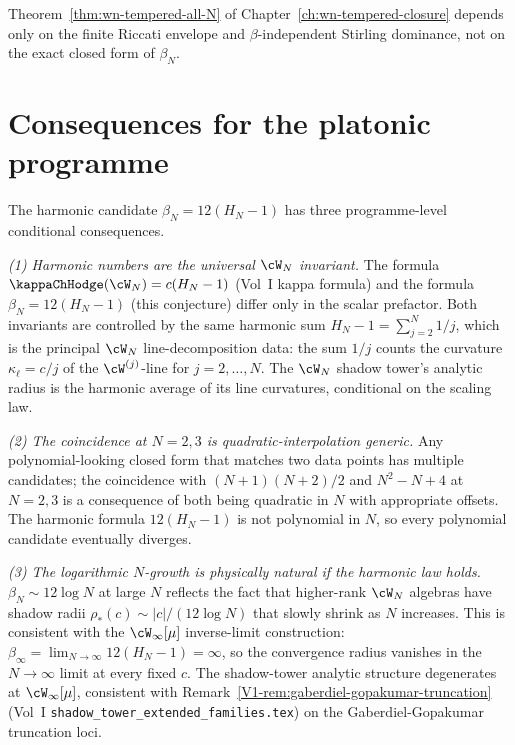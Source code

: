 Theorem~\ref{thm:wn-tempered-all-N} of Chapter~\ref{ch:wn-tempered-closure}
depends only on the finite Riccati envelope and $\beta$-independent
Stirling dominance, not on the exact closed form of $\beta_N$.

\section{Consequences for the platonic programme}
\label{sec:beta-N-platonic-consequences}

The harmonic candidate $\beta_N = 12(H_N - 1)$ has three
programme-level conditional consequences.

\emph{(1) Harmonic numbers are the universal $\cW_N$ invariant.}
The formula $\kappaChHodge(\cW_N) = c(H_N - 1)$ (Vol~I kappa formula) and the
formula $\beta_N = 12(H_N - 1)$ (this conjecture) differ only in the
scalar prefactor. Both invariants are controlled by the same harmonic
sum $H_N - 1 = \sum_{j=2}^{N} 1/j$, which is the principal $\cW_N$
line-decomposition data: the sum $1/j$ counts the curvature $\kappa_\ell =
c/j$ of the $\cW^{(j)}$-line for $j = 2, \ldots, N$. The $\cW_N$
shadow tower's analytic radius is the harmonic average of its line
curvatures, conditional on the scaling law.

\emph{(2) The coincidence at $N = 2, 3$ is quadratic-interpolation
generic.} Any polynomial-looking closed form that matches two data
points has multiple candidates; the coincidence with $(N+1)(N+2)/2$
and $N^2 - N + 4$ at $N = 2, 3$ is a consequence of both being
quadratic in $N$ with appropriate offsets. The harmonic formula
$12(H_N - 1)$ is not polynomial in $N$, so every polynomial candidate
eventually diverges.

\emph{(3) The logarithmic $N$-growth is physically natural if the
harmonic law holds.}
$\beta_N \sim 12 \log N$ at large $N$ reflects the fact that higher-rank
$\cW_N$ algebras have shadow radii $\rho_*(c) \sim |c|/(12 \log N)$
that slowly shrink as $N$ increases. This is consistent with the
$\cW_\infty[\mu]$ inverse-limit construction:
$\beta_\infty = \lim_{N \to \infty} 12 (H_N - 1) = \infty$, so the
convergence radius vanishes in the $N \to \infty$ limit at every fixed
$c$. The shadow-tower analytic structure degenerates at
$\cW_\infty[\mu]$, consistent with
Remark~\ref{V1-rem:gaberdiel-gopakumar-truncation}
(Vol~I \texttt{shadow\_tower\_extended\_families.tex}) on the
Gaberdiel-Gopakumar truncation loci.


